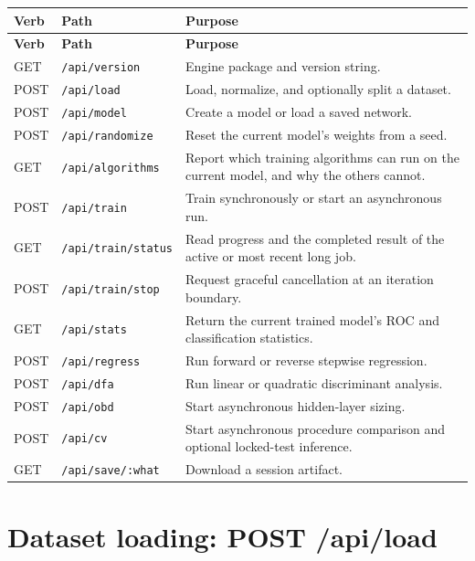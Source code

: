 \begin{longtable}{|>{\raggedright\arraybackslash}p{0.45in}|>{\raggedright\arraybackslash}p{1.35in}|>{\raggedright\arraybackslash}p{2.35in}|}
\hline
\textbf{Verb} & \textbf{Path} & \textbf{Purpose} \\ \hline
\endfirsthead
\hline
\textbf{Verb} & \textbf{Path} & \textbf{Purpose} \\ \hline
\endhead
GET & \texttt{/api/version} & Engine package and version string. \\ \hline
POST & \texttt{/api/load} & Load, normalize, and optionally split a dataset. \\ \hline
POST & \texttt{/api/model} & Create a model or load a saved network. \\ \hline
POST & \texttt{/api/randomize} & Reset the current model's weights from a seed. \\ \hline
GET & \texttt{/api/algorithms} & Report which training algorithms can run on the current model, and why the others cannot. \\ \hline
POST & \texttt{/api/train} & Train synchronously or start an asynchronous run. \\ \hline
GET & \texttt{/api/train/status} & Read progress and the completed result of the active or most recent long job. \\ \hline
POST & \texttt{/api/train/stop} & Request graceful cancellation at an iteration boundary. \\ \hline
GET & \texttt{/api/stats} & Return the current trained model's ROC and classification statistics. \\ \hline
POST & \texttt{/api/regress} & Run forward or reverse stepwise regression. \\ \hline
POST & \texttt{/api/dfa} & Run linear or quadratic discriminant analysis. \\ \hline
POST & \texttt{/api/obd} & Start asynchronous hidden-layer sizing. \\ \hline
POST & \texttt{/api/cv} & Start asynchronous procedure comparison and optional locked-test inference. \\ \hline
GET & \texttt{/api/save/:what} & Download a session artifact. \\ \hline
\end{longtable}

\section{Dataset loading: POST /api/load}

